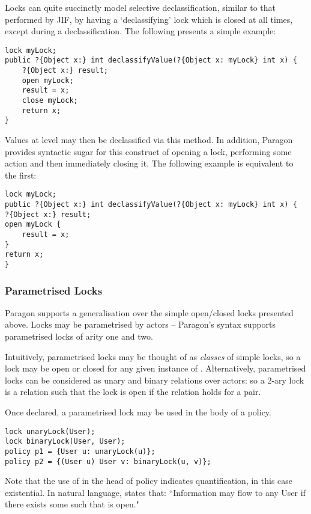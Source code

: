 Locks can quite succinctly model selective declassification, similar to that performed by JIF, by having a `declassifying' lock which is closed at all times, except during a declassification. The following presents a simple example:

\begin{verbatim}
lock myLock;
public ?{Object x:} int declassifyValue(?{Object x: myLock} int x) {
	?{Object x:} result;
	open myLock;
	result = x;
	close myLock;
	return x;
}
\end{verbatim}

Values at level  may then be declassified via this method. In addition, Paragon provides syntactic sugar for this construct of opening a lock, performing some action and then immediately closing it. The following example is equivalent to the first:

\begin{verbatim}
lock myLock;
public ?{Object x:} int declassifyValue(?{Object x: myLock} int x) {
?{Object x:} result;
open myLock {
	result = x;
}
return x;
}
\end{verbatim}

\newpage

\subsubsection{Parametrised Locks}

Paragon supports a generalisation over the simple open/closed locks presented above. Locks may be parametrised by actors -- Paragon's syntax supports parametrised locks of arity one and two.

Intuitively, parametrised locks may be thought of as \textit{classes} of simple locks, so a lock  may be open or closed for any given instance of . Alternatively, parametrised locks can be considered as unary and binary relations over actors: so a 2-ary lock  is a relation such that the lock is open if the relation holds for a  pair.

Once declared, a parametrised lock may be used in the body of a policy.

\begin{verbatim}
lock unaryLock(User);
lock binaryLock(User, User);
policy p1 = {User u: unaryLock(u)};
policy p2 = {(User u) User v: binaryLock(u, v)};
\end{verbatim}

Note that the use of  in the head of policy  indicates quantification, in this case existential. In natural language,  states that: ``Information may flow to any User  if there exists some  such that  is open."

